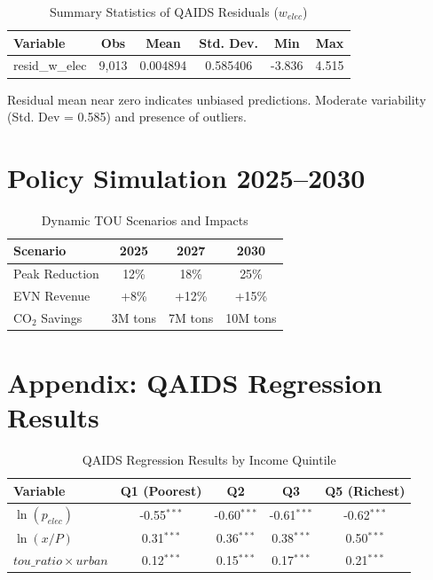 \documentclass[12pt,a4paper]{article}
\begin{document}
	\begin{table}[H]
		\centering
		\caption{Summary Statistics of QAIDS Residuals ($w_{elec}$)}
		\begin{tabular}{lccccc}
			\toprule
			Variable & Obs & Mean & Std. Dev. & Min & Max \\
			\midrule
			resid\_w\_elec & 9,013 & 0.004894 & 0.585406 & -3.836 & 4.515 \\
			\bottomrule
		\end{tabular}		
		\begin{tablenotes}
			\small
			\item Residual mean near zero indicates unbiased predictions. Moderate variability (Std. Dev = 0.585) and presence of outliers.
		\end{tablenotes}
	\end{table}
	
	\section{Policy Simulation 2025--2030}
	
	\begin{table}[H]
		\centering
		\caption{Dynamic TOU Scenarios and Impacts}
		\label{tab:policy}
		\begin{tabular}{lccc}
			\toprule
			Scenario & 2025 & 2027 & 2030 \\
			\midrule
			Peak Reduction & 12\% & 18\% & 25\% \\
			EVN Revenue & +8\% & +12\% & +15\% \\
			CO$_2$ Savings & 3M tons & 7M tons & 10M tons \\
			\bottomrule
		\end{tabular}
	\end{table}
	
	\clearpage
	\section*{Appendix: QAIDS Regression Results}
	
	\begin{table}[H]
		\centering
		\caption{QAIDS Regression Results by Income Quintile}
		\begin{tabular}{lcccc}
			\toprule
			Variable & Q1 (Poorest) & Q2 & Q3 & Q5 (Richest) \\
			\midrule
			$\ln(p_{elec})$ & -0.55$^{***}$ & -0.60$^{***}$ & -0.61$^{***}$ & -0.62$^{***}$ \\
			$\ln(x/P)$ & 0.31$^{***}$ & 0.36$^{***}$ & 0.38$^{***}$ & 0.50$^{***}$ \\
			$tou\_ratio \times urban$ & 0.12$^{***}$ & 0.15$^{***}$ & 0.17$^{***}$ & 0.21$^{***}$ \\
			\bottomrule
		\end{tabular}
	\end{table}
	
\end{document}
